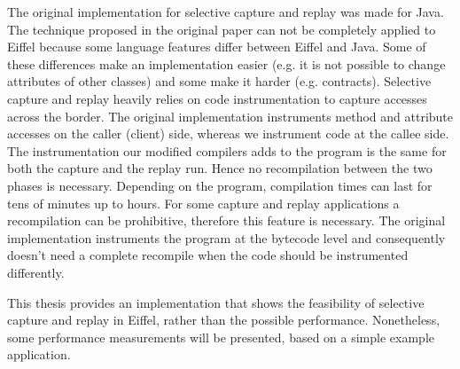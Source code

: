 The original implementation for selective capture and replay was made for Java. The technique proposed in the original paper can not be completely applied to Eiffel because some language features differ between Eiffel and Java. Some of these differences make an implementation easier (e.g. it is not possible to change attributes of other classes) and some make it harder (e.g. contracts). Selective capture and replay heavily relies on code instrumentation to capture accesses across the border. The original implementation instruments method and attribute accesses on the caller (client) side, whereas we instrument code at the callee side. The instrumentation our modified compilers adds to the program is the same for both the capture and the replay run. Hence no recompilation between the two phases is necessary. Depending on the program, compilation times can last for tens of minutes up to hours. For some capture and replay applications a recompilation can be prohibitive, therefore this feature is necessary. The original implementation instruments the program at the bytecode level and consequently doesn't need a complete recompile when the code should be instrumented differently.

  This thesis provides an implementation that shows the feasibility of selective capture and replay in Eiffel, rather than the possible performance. Nonetheless, some performance measurements will be presented, based on a simple example application.


